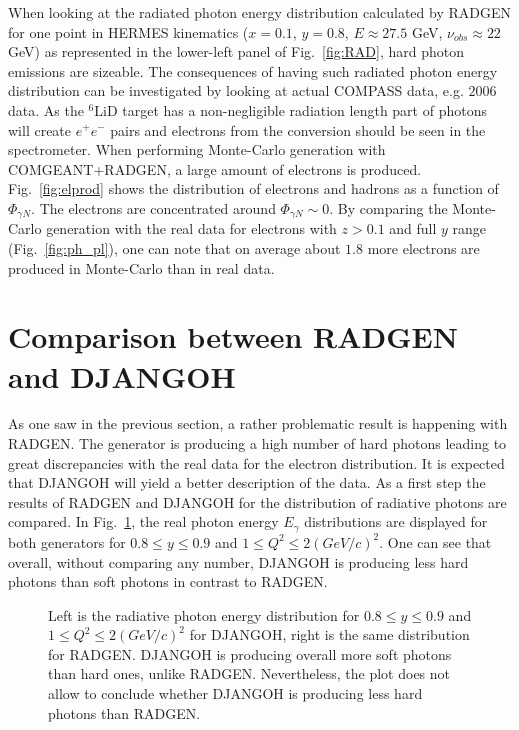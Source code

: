 When looking at the radiated photon energy distribution calculated by RADGEN for one point in HERMES kinematics ($x=0.1$, $y=0.8$, $E\approx27.5$ GeV, $\nu_{obs}\approx22$ GeV) as represented in the lower-left panel of Fig.~\ref{fig:RAD}, hard photon emissions are sizeable. The consequences of  having such radiated photon energy distribution can be investigated by looking at actual COMPASS data, e.g. $2006$ data. As the $^{6}$LiD target has a non-negligible radiation length part of photons will create $e^+e^-$ pairs and electrons from the conversion should be seen in the spectrometer. When performing Monte-Carlo generation with COMGEANT+RADGEN, a large amount of electrons is produced. Fig.~\ref{fig:elprod} shows the distribution of electrons and hadrons as a function of $\Phi_{\gamma N}$. The electrons are concentrated around $\Phi_{\gamma N} \sim 0$. By comparing the Monte-Carlo generation with the real data for electrons with $z>0.1$ and full $y$ range (Fig.~\ref{fig:ph_pl}), one can note that on average about $1.8$ more electrons are produced in Monte-Carlo than in real data.


\section{Comparison between RADGEN and DJANGOH}

As one saw in the previous section, a rather problematic result is happening with RADGEN. The generator is producing a high number of hard photons leading to great discrepancies with the real data for the electron distribution. It is expected that DJANGOH will yield a better description of the data. As a first step the results of RADGEN and DJANGOH for the distribution of radiative photons are compared. In Fig.~\ref{fig:DJRAD}, the real photon energy $E_{\gamma}$ distributions are displayed for both generators for $0.8 \leq y \leq 0.9$ and $1 \leq Q^2 \leq 2 (GeV/c)^2$. One can see that overall, without comparing any number, DJANGOH is producing less hard photons than soft photons in contrast to RADGEN.

\begin{figure}[htb]
\centerline{}
\caption{Left is the radiative photon energy distribution for $0.8 \leq y \leq 0.9$ and $1 \leq Q^2 \leq 2 (GeV/c)^2$ for DJANGOH, right is the same distribution for RADGEN. DJANGOH is producing overall more soft photons than hard ones, unlike RADGEN. Nevertheless, the plot does not allow to conclude whether DJANGOH is producing less hard photons than RADGEN.}\label{fig:DJRAD}
\end{figure}

